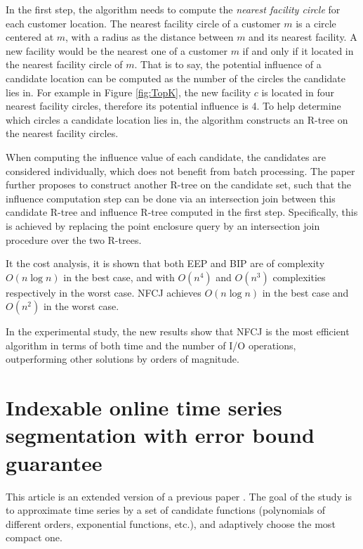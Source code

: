 \documentclass[paper=a4, fontsize=18pt]{article} %
\numberwithin{equation}{section} %
\numberwithin{figure}{section} %
\numberwithin{table}{section} %
\begin{document}
In the first step, the algorithm needs to compute the \emph{nearest facility circle} for each customer location. The nearest facility circle of a customer $m$ is a circle centered at $m$, with a radius as the distance between $m$ and its nearest facility. A new facility would be the nearest one of a customer $m$ if and only if it located in the nearest facility circle of $m$. That is to say, the potential influence of a candidate location can be computed as the number of the circles the candidate lies in. For example in Figure \ref{fig:TopK}, the new facility $c$ is located in four nearest facility circles, therefore its potential influence is 4. To help determine which circles a candidate location lies in, the algorithm constructs an R-tree on the nearest facility circles.

When computing the influence value of each candidate, the candidates are considered individually, which does not benefit from batch processing. The paper further proposes to construct another R-tree on the candidate set, such that the influence computation step can be done via an intersection join between this candidate R-tree and influence R-tree computed in the first step. Specifically, this is achieved by replacing the point enclosure query by an intersection join procedure over the two R-trees.

It the cost analysis, it is shown that both EEP and BIP are of complexity $O(n \log n)$ in the best case, and with $O(n^4)$ and $O(n^3)$ complexities respectively in the worst case. NFCJ achieves $O(n \log n)$ in the best case and $O(n^2)$ in the worst case.

In the experimental study, the new results show that NFCJ is the most efficient algorithm in terms of both time and the number of I/O operations, outperforming other solutions by orders of magnitude.

\section{Indexable online time series segmentation with error bound guarantee \cite{Qi0RWWW15}}

This article is an extended version of a previous paper \cite{XZRP12}. The goal of the study is to approximate time series by a set of candidate functions (polynomials of different orders, exponential functions, etc.), and adaptively choose the most compact one.
\end{document}
